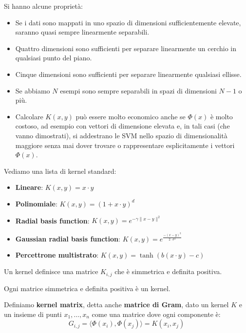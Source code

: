 Si hanno alcune proprietà:
\begin{itemize}
    \item Se i dati sono mappati in uno spazio di dimensioni sufficientemente
          elevate, saranno quasi sempre linearmente separabili.
    \item Quattro dimensioni sono sufficienti per separare linearmente un cerchio
          in qualsiasi punto del piano.
    \item Cinque dimensioni sono sufficienti per separare linearmente qualsiasi
          ellisse.
    \item Se abbiamo $N$ esempi sono sempre separabili in spazi di dimensioni
          $N - 1$ o più.
    \item Calcolare $K(x, y)$ può essere molto economico anche se $\Phi(x)$ è
          molto costoso, ad esempio con vettori di dimensione elevata e, in tali
          casi (che vanno dimostrati), si addestrano le SVM nello spazio di
          dimensionalità maggiore senza mai dover trovare o rappresentare
          esplicitamente i vettori $\Phi(x)$.
\end{itemize}
Vediamo una lista di kernel standard:
\begin{itemize}
    \item \textbf{Lineare}: $K(x, y) = x \cdot y$
    \item \textbf{Polinomiale}: $K(x, y) = (1 + x \cdot y)^d$
    \item \textbf{Radial basis function}: $K(x, y) = e^{-\gamma \| x - y\|^2}$
    \item \textbf{Gaussian radial basis function}: $K(x, y) = e^{\frac{-(x-y)^2}
                      {2 \cdot \sigma^2}}$
    \item \textbf{Percettrone multistrato}: $K(x, y) = \tanh(b(x \cdot y) - c)$
\end{itemize}
\begin{teorema}
    Un kernel definisce una matrice $K_{i,j}$ che è simmetrica e definita positiva.
\end{teorema}
\begin{teorema}
    Ogni matrice simmetrica e definita positiva è un kernel.
\end{teorema}
\begin{definizione}
    Definiamo \textbf{kernel matrix}, detta anche \textbf{matrice di Gram},
    dato un kernel $K$ e un insieme di punti $x_1, \dots, x_n$ come una matrice
    dove ogni componente è:
    \begin{equation}
        G_{i, j} = \langle \Phi(x_i), \Phi(x_j) \rangle = K(x_i, x_j)
    \end{equation}
\end{definizione}
